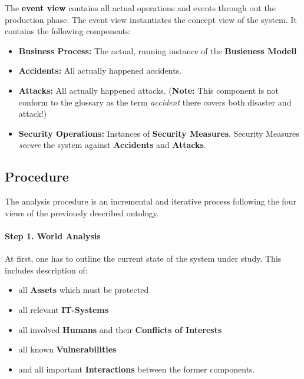The \textbf{event view} contains all actual operations and events through out the production phase.
The event view instantiates the concept view of the system.
It contains the following components:
\begin{itemize}
\item
  \textbf{Business Process:} The actual, running instance of the
  \textbf{Busieness Modell}
\item
  \textbf{Accidents:} All actually happened accidents.
\item
  \textbf{Attacks:} All actually happened attacks. (\textbf{Note:} This
  component is not conform to the glossary as the term \emph{accident}
  there covers both disaster and attack!)
\item
  \textbf{Security Operations:} Instances of \textbf{Security Measures}.
  Security Measures \emph{secure} the system against \textbf{Accidents}
  and \textbf{Attacks}.
\end{itemize}

\subsection{Procedure}

The analysis procedure is an incremental and iterative process following
the four views of the previously described ontology.



\paragraph{Step 1. World Analysis}

At first, one has to outline the current state of the system under
study. This includes description of:

\begin{itemize}

\item
  all \textbf{Assets} which must be protected
\item
  all relevant \textbf{IT-Systems}
\item
  all involved \textbf{Humans} and their \textbf{Conflicts of Interests}
\item
  all known \textbf{Vulnerabilities}
\item
  and all important \textbf{Interactions} between the former components.
\end{itemize}

